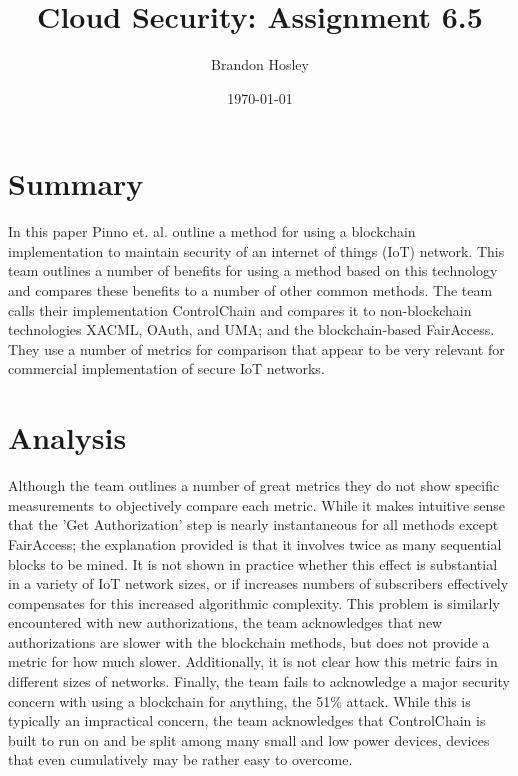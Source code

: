 \documentclass[]{article}
\title{Cloud Security: Assignment 6.5}
\author{Brandon Hosley}
\date{\today}
\begin{document}
	\maketitle
	
\section{Summary} 

In this paper\cite{Pinno2017} Pinno et. al. outline a method for using a blockchain implementation to maintain security of an internet of things (IoT) network.
This team outlines a number of benefits for using a method based on this technology and compares these benefits to a number of other common methods.
The team calls their implementation ControlChain and compares it to non-blockchain technologies XACML, OAuth, and UMA; and the blockchain-based FairAccess.
They use a number of metrics for comparison that appear to be very relevant for commercial implementation of secure IoT networks.


\section{Analysis}


Although the team outlines a number of great metrics they do not show specific measurements to objectively compare each metric.
While it makes intuitive sense that the 'Get Authorization' step is nearly instantaneous for all methods except FairAccess; 
the explanation provided is that it involves twice as many sequential blocks to be mined.
It is not shown in practice whether this effect is substantial in a variety of IoT network sizes, or if increases numbers of subscribers effectively compensates for this increased algorithmic complexity.
This problem is similarly encountered with new authorizations, the team acknowledges that new authorizations are slower with the blockchain methods, but does not provide a metric for how much slower.
Additionally, it is not clear how this metric fairs in different sizes of networks.
Finally, the team fails to acknowledge a major security concern with using a blockchain for anything, the 51\% attack.
While this is typically an impractical concern, the team acknowledges that ControlChain is built to run on and be split among many small and low power devices, devices that even cumulatively may be rather easy to overcome.

\clearpage


\end{document}
